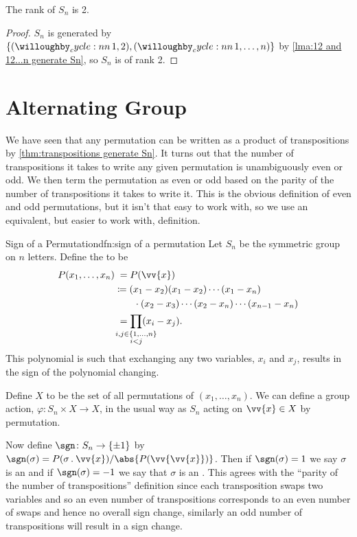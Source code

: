 \begin{crl}{}{}
    The rank of \(S_n\) is 2.
    \begin{proof}
        \(S_n\) is generated by \(\{\cycle{1, 2}, \cycle{1, \dotsc, n}\}\) by \cref{lma:12 and 12...n generate Sn}, so \(S_n\) is of rank 2.
    \end{proof}
\end{crl}

\section{Alternating Group}
We have seen that any permutation can be written as a product of transpositions by \cref{thm:transpositions generate Sn}.
It turns out that the number of transpositions it takes to write any given permutation is unambiguously even or odd.
We then term the permutation as even or odd based on the parity of the number of transpositions it takes to write it.
This is the obvious definition of even and odd permutations, but it isn't that easy to work with, so we use an equivalent, but easier to work with, definition.

\begin{dfn}{Sign of a Permutation}{dfn:sign of a permutation}
    Let \(S_n\) be the symmetric group on \(n\) letters.
    Define the  to be
    \begin{align}
        P(x_1, \dotsc, x_n) &\hphantom{:}= P(\vv{x})\\
        &\coloneqq (x_1 - x_2)(x_1 - x_2) \dotsm (x_1 - x_n)\\
        &\qquad\cdot(x_2 - x_3) \dotsm (x_2 - x_n) \dotsm (x_{n - 1} - x_n)\\
        &\hphantom{:}= \prod_{\mathclap{\substack{i, j \in \{1, \dotsc, n\}\\ i < j}}} (x_i - x_j).
    \end{align}
    This polynomial is such that exchanging any two variables, \(x_i\) and \(x_j\), results in the sign of the polynomial changing.
    
    Define \(X\) to be the set of all permutations of \((x_1, \dotsc, x_n)\).
    We can define a group action, \(\varphi \colon S_n \times X \to X\), in the usual way as \(S_n\) acting on \(\vv{x} \in X\) by permutation.
    
    Now define \(\sgn \colon S_n \to \{\pm 1\}\) by \(\sgn(\sigma) = P(\sigma\action \vv{x})/\abs{P(\vv{\vv{x}})}\).
    Then if \(\sgn(\sigma) = 1\) we say \(\sigma\) is an  and if \(\sgn(\sigma) = -1\) we say that \(\sigma\) is an .
    This agrees with the \enquote{parity of the number of transpositions} definition since each transposition swaps two variables and so an even number of transpositions corresponds to an even number of swaps and hence no overall sign change, similarly an odd number of transpositions will result in a sign change.
\end{dfn}

